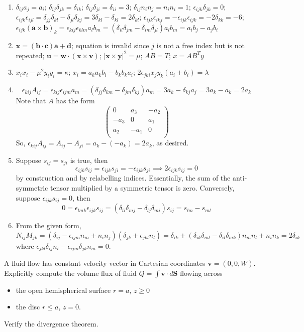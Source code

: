 \documentclass[a4paper]{article}
\begin{document}
\begin{ans}\leavevmode
\begin{enumerate}[label=(\alph*)]
    \item 
$\delta_{ij}a_j=a_i$; $\delta_{ij}\delta_{jk}=\delta_{ik}$; $\delta_{ij}\delta_{ji}=\delta_{ii}=3$; $\delta_{ij}n_in_j=n_in_i=1$; $\epsilon_{ijk}\delta_{jk}=0$; $\epsilon_{ijk}\epsilon_{ijl}=\delta_{jj}\delta_{kl}-\delta_{jl}\delta_{kj}=3\delta_{kl}-\delta_{kl}=2\delta_{kl}$; $\epsilon_{ijk}\epsilon_{ikj}=-\epsilon_{ijk}\epsilon_{ijk}=-2\delta_{kk}=-6$; $\epsilon_{ijk}(\mathbf{a}\times\mathbf{b})_k=\epsilon_{kij}\epsilon_{klm}a_lb_m=(\delta_{il}\delta_{jm}-\delta_{im}\delta_{jl})a_lb_m=a_ib_j-a_jb_i$
\item $\mathbf{x}=(\mathbf{b}\cdot\mathbf{c})\mathbf{a}+\mathbf{d}$; equation is invalid since $j$ is not a free index but is not repeated; $\mathbf{u}=\mathbf{w}\cdot(\mathbf{x}\times\mathbf{v})$; $|\mathbf{x}\times\mathbf{y}|^2=\mu$; $AB=T$; $x=AB^Ty$
\item $x_ix_i-\mu^2y_iy_i=\kappa$; $x_i=a_ka_kb_i-b_kb_ka_i$; $2\epsilon_{jki}x_jy_k(a_i+b_i)=\lambda$
\item
$$\epsilon_{kij}A_{ij}=\epsilon_{kij}\epsilon_{ijm}a_m=(\delta_{jj}\delta_{km}-\delta_{jm}\delta_{kj})a_m=3a_k-\delta_{kj}a_j=3a_k-a_k=2a_k$$
Note that $A$ has the form 
$$\begin{pmatrix}0&a_3&-a_2\\-a_3&0&a_1\\a_2&-a_1&0\\\end{pmatrix}$$
So, $\epsilon_{kij}A_{ij}=A_{ij}-A_{ji}=a_k-(-a_k)=2a_k$, as desired.
\item Suppose $s_{ij}=s_{ji}$ is true, then
$$\epsilon_{ijk}s_{ij}=\epsilon_{ijk}s_{ji}=-\epsilon_{ijk}s_{ji}\implies 2\epsilon_{ijk}s_{ij}=0$$
by construction and by relabelling indices. Essentially, the sum of the anti-symmetric tensor multiplied by a symmetric tensor is zero.  Conversely, suppose $\epsilon_{ijk}s_{ij}=0$, then
$$0=\epsilon_{lmk}\epsilon_{ijk}s_{ij}=(\delta_{li}\delta_{mj}-\delta_{lj}\delta_{mi})s_{ij}=s_{lm}-s_{ml}$$
\item From the given form,
$$N_{ij}M_{jk}=(\delta_{ij}-\epsilon_{ijm}n_m+n_in_j)(\delta_{jk}+\epsilon_{jkl}n_l)=\delta_{ik}+(\delta_{ik}\delta_{ml}-\delta_{il}\delta_{mk})n_mn_l+n_in_k=2\delta_{ik}$$
where $\epsilon_{jkl}\delta_{ij}n_l-\epsilon_{ijm}\delta_{jk}n_m=0$.
\end{enumerate} 
\end{ans}
\newpage
\begin{qns}
A fluid flow has constant velocity vector in Cartesian coordinates $\mathbf{v}=(0,0,W)$. Explicitly compute the volume flux of fluid $Q=\int\mathbf{v}\cdot d\mathbf{S}$ flowing across
\begin{itemize}
    \item the open hemispherical surface $r=a$, $z\geq0$
    \item the disc $r\leq a$, $z=0$.
\end{itemize}
Verify the divergence theorem.
\end{qns}
\end{document}
